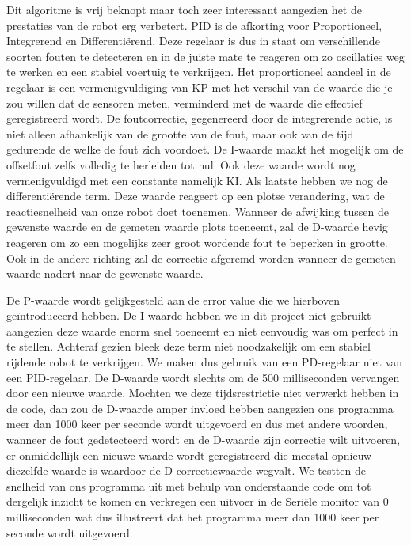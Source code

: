Dit algoritme is vrij beknopt maar toch zeer interessant aangezien het de prestaties van de robot erg verbetert. PID is de afkorting voor Proportioneel, Integrerend en Differenti\"erend. Deze regelaar is dus in staat om verschillende soorten fouten te detecteren en in de juiste mate te reageren om zo oscillaties weg te werken en een stabiel voertuig te verkrijgen. Het proportioneel aandeel in de regelaar is een vermenigvuldiging van KP met het verschil van de waarde die je zou willen dat de sensoren meten, verminderd met de waarde die effectief geregistreerd wordt. De foutcorrectie, gegenereerd door de integrerende actie, is niet alleen afhankelijk van de grootte van de fout, maar ook van de tijd gedurende de welke de fout zich voordoet. De I-waarde maakt het mogelijk om de offsetfout zelfs volledig te herleiden tot nul. Ook deze waarde wordt nog vermenigvuldigd met een constante namelijk KI. Als laatste hebben we nog de differenti\"erende term. Deze waarde reageert op een plotse verandering, wat de reactiesnelheid van onze robot doet toenemen. Wanneer de afwijking tussen de gewenste waarde en de gemeten waarde plots toeneemt, zal de D-waarde hevig reageren om zo een mogelijks zeer groot wordende fout te beperken in grootte. Ook in de andere richting zal de correctie afgeremd worden wanneer de gemeten waarde nadert naar de gewenste waarde. 

De P-waarde wordt gelijkgesteld aan de error value die we hierboven ge\"introduceerd hebben. De I-waarde hebben we in dit project niet gebruikt aangezien deze waarde enorm snel toeneemt en niet eenvoudig was om perfect in te stellen. Achteraf gezien bleek deze term niet noodzakelijk om een stabiel rijdende robot te verkrijgen. We maken dus gebruik van een PD-regelaar niet van een PID-regelaar. De D-waarde wordt slechts om de 500 milliseconden vervangen door een nieuwe waarde. Mochten we deze tijdsrestrictie niet verwerkt hebben in de code, dan zou de D-waarde amper invloed hebben aangezien ons programma meer dan 1000 keer per seconde wordt uitgevoerd en dus met andere woorden, wanneer de fout gedetecteerd wordt en de D-waarde zijn correctie wilt uitvoeren, er onmiddellijk een nieuwe waarde wordt geregistreerd die meestal opnieuw diezelfde waarde is waardoor de D-correctiewaarde wegvalt. We testten de snelheid van ons programma uit met behulp van onderstaande code om tot dergelijk inzicht te komen en verkregen een uitvoer in de Seri\"ele monitor van 0 milliseconden wat dus illustreert dat het programma meer dan 1000 keer per seconde wordt uitgevoerd.

